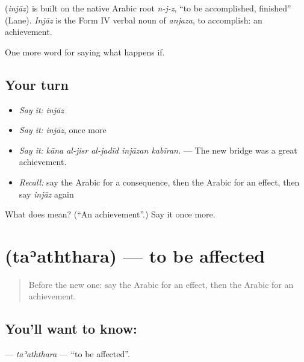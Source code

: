 \begin{cousinweb}
\textbf{} (\emph{injāz}) is built on the native Arabic root \emph{n-j-z}, \textquotedblleft{}to be accomplished, finished\textquotedblright{} (Lane). \emph{Injāz} is the Form IV verbal noun of \emph{anjaza}, to accomplish: an achievement.
\end{cousinweb}

\begin{grammarlens}[title={What you've built}]
One more word for saying what happens if.
\end{grammarlens}

\subsection*{Your turn}
\begin{itemize}
\raggedright
  \item \emph{Say it:} \emph{injāz}
  \item \emph{Say it:} \emph{injāz}, once more
  \item \emph{Say it:} \emph{kāna al-jisr al-jadīd injāzan kabīran.} — The new bridge was a great achievement.
  \item \emph{Recall:} say the Arabic for a consequence, then the Arabic for an effect, then say \emph{injāz} again
\end{itemize}

\begin{tcolorbox}[breakable,colback=teal!4,colframe=teal!35!black,title={Before you move on}]
What does  mean? (\textquotedblleft{}An achievement\textquotedblright{}.) Say it once more.
\end{tcolorbox}
\section[\texorpdfstring{\ar{تأثر} (taʾaththara)}{تأثر (taʾaththara)}]{ (taʾaththara) — to be affected}

\label{lesson:AR-C415-taaththara-affected}



\begin{quote}
Before the new one: say the Arabic for an effect, then the Arabic for an achievement.
\end{quote}

\subsection*{You'll want to know: }
\textbf{} — \emph{taʾaththara} — \textquotedblleft{}to be affected\textquotedblright{}.


